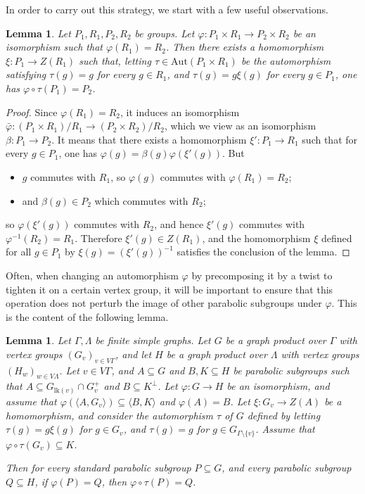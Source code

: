 \documentclass[a4paper,english,11pt]{article}
\newtheorem{lemma}[de]{Lemma}
\theoremstyle{definition}
\theoremstyle{remark}
\newcommand{\lk}{\mathrm{lk}}
\newcommand{\Aut}{\mathrm{Aut}}
\newcommand{\twistor}{\xi}
\begin{document}
In order to carry out this strategy, we start with a few useful observations.

\begin{lemma}\label{Lmm:detwister-un-facteur-direct}
Let $P_1,R_1,P_2,R_2$ be groups. Let $\varphi:P_1\times R_1\to P_2\times R_2$ be an isomorphism such that $\varphi(R_1)=R_2$. Then there exists a homomorphism $\twistor:P_1\to Z(R_1)$ such that, letting $\tau\in\Aut(P_1\times R_1)$ be the automorphism satisfying $\tau(g)=g$ for every $g\in R_1$, and $\tau(g)=g\twistor(g)$ for every $g\in P_1$, one has $\varphi\circ\tau(P_1)=P_2$.
\end{lemma}

\begin{proof} Since $\varphi(R_1)=R_2$, it induces an isomorphism $\bar\varphi:(P_1\times R_1)/R_1\to (P_2\times R_2)/R_2$, which we view as an isomorphism $\beta:P_1\to P_2$. It means that there exists a homomorphism $\twistor':P_1\to R_1$ such that for every $g\in P_1$, one has $\varphi(g)=\beta(g)\varphi(\twistor'(g))$. But
\begin{itemize}
    \item $g$ commutes with $R_1$, so $\varphi(g)$ commutes with $\varphi(R_1)=R_2$;
    \item and $\beta(g)\in P_2$ which commutes with $R_2$;
\end{itemize}
so $\varphi(\twistor'(g))$ commutes with $R_2$, and hence $\twistor'(g)$ commutes with $\varphi^{-1}(R_2)=R_1$. Therefore $\twistor'(g)\in Z(R_1)$, and the homomorphism $\twistor$ defined for all $g\in P_1$ by $\twistor(g)=(\twistor'(g))^{-1}$ satisfies the conclusion of the lemma.
\end{proof}

Often, when changing an automorphism $\varphi$ by precomposing it by a twist to tighten it on a certain vertex group, it will be important to ensure that this operation does not perturb the image of other parabolic subgroups under $\varphi$. This is the content of the following lemma.

\begin{lemma}\label{lemma:redress}
Let $\Gamma,\Lambda$ be finite simple graphs. Let $G$ be a graph product over $\Gamma$ with vertex groups $(G_v)_{v\in V\Gamma}$, and let $H$ be a graph product over $\Lambda$ with vertex groups $(H_w)_{w\in V\Lambda}$. Let $v\in V\Gamma$, and $A\subseteq G$ and $B,K\subseteq H$ be parabolic subgroups such that $A\subseteq G_{\lk(v)}\cap G_v^+$ and $B\subseteq K^\perp$. Let $\varphi:G\to H$ be an isomorphism, and assume that $\varphi(\langle A,G_v\rangle)\subseteq \langle B,K\rangle$ and $\varphi(A)=B$. Let $\twistor:G_v\to Z(A)$ be a homomorphism, and consider the automorphism $\tau$ of $G$ defined by letting $\tau(g)=g\twistor(g)$ for $g\in G_v$, and $\tau(g)=g$ for $g\in G_{\Gamma\setminus\{v\}}$. Assume that $\varphi\circ\tau(G_v)\subseteq K$.

Then for every standard parabolic subgroup $P\subseteq G$, and every parabolic subgroup $Q\subseteq H$, if $\varphi(P)=Q$, then $\varphi\circ\tau(P)=Q$. 
\end{lemma}
\end{document}
